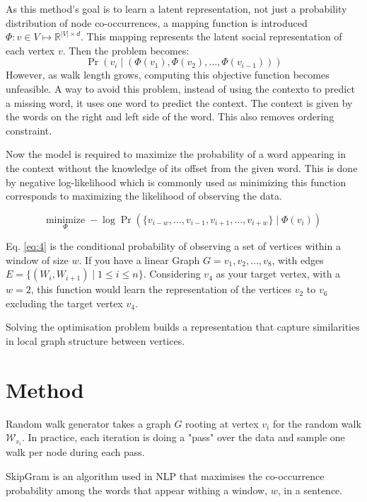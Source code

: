 \documentclass{article}
\begin{document}
As this method's goal is to learn a latent representation, not just a
probability distribution of node co-occurrences, a mapping function is
introduced $\Phi: v \in V \mapsto \mathbb{R}^{\vert V \vert \times d} $.
This mapping represents the latent social representation of each vertex $v$.
Then the problem becomes:
\begin{equation}
  \Pr(v_i \mid (\Phi(v_1), \Phi(v_2), \ldots, \Phi(v_{i-1})))
  \label{eq:3}
\end{equation}
However, as walk length grows, computing this objective function becomes
unfeasible. A way to avoid this problem, instead of using the contexto to
predict a missing word, it uses one word to predict the context. The context is
given by the words on the right and left side of the word. This also removes
ordering constraint. 

Now the model is required to maximize the probability of a word appearing in
the context without the knowledge of its offset from the given word. This is
done by negative log-likelihood which is commonly used as minimizing this
function corresponds to maximizing the likelihood of observing the data.

\begin{equation}
  \underset{\Phi}{\text{minimize}} \; -\log \Pr\left( \{v_{i-w}, \ldots,
  v_{i-1}, v_{i+1}, \ldots, v_{i+w}\} \mid \Phi(v_i) \right)
  \label{eq:4}
\end{equation}

Eq. \ref{eq:4} is the conditional probability of observing a set of vertices
within a window of size $w$. If you have a linear Graph $G = v_1, v_2, \ldots, v_8$,
with edges $E = \{ (W_i, W_{i+1}) \mid 1 \leq i \leq n \}$. 
Considering $v_4$ as your target vertex, with a $w = 2$, this function would
learn the representation of the vertices $v_2$ to $v_6$ excluding the target
vertex $v_4$.

Solving the optimisation problem builds a representation that capture similarities
in local graph structure between vertices. 

\section{Method}
Random walk generator takes a graph $G$ rooting at vertex $v_i$ for the random walk $\mathcal{W}_{v_i}$.
In practice, each iteration is doing a "pass" over the data and sample one walk per node during each pass.

SkipGram is an algorithm used in NLP that maximises the co-occurrence probability among the words that 
appear withing a window, $w$, in a sentence.
\end{document}
